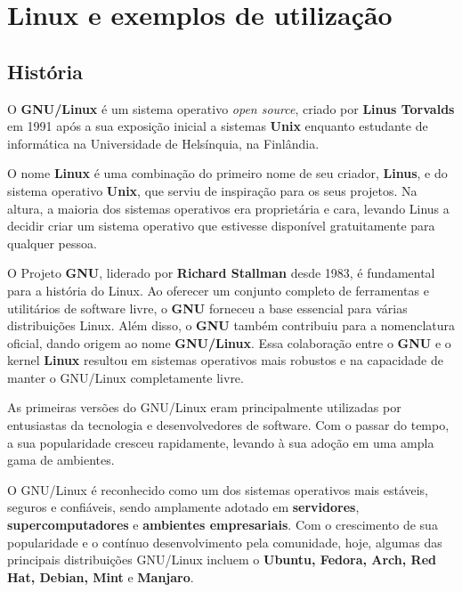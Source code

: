 ﻿\section{Linux e exemplos de utilização} \label{section: linux e exemplos}

\subsection{História}
O \textbf{GNU/Linux} é um sistema operativo \textit{open source}, criado por \textbf{Linus Torvalds} em 1991 após a sua exposição inicial a sistemas \textbf{Unix} enquanto estudante de informática na Universidade de Helsínquia, na Finlândia.
\par \vspace{6pt}
O nome \textbf{Linux} é uma combinação do primeiro nome de seu criador, \textbf{Linus}, e do sistema operativo \textbf{Unix}, que serviu de inspiração para os seus projetos. Na altura, a maioria dos sistemas operativos era proprietária e cara, levando Linus a decidir criar um sistema operativo que estivesse disponível gratuitamente para qualquer pessoa. \cite{linuxHistory}
\par \vspace{6pt}
O Projeto \textbf{GNU}, liderado por \textbf{Richard Stallman} desde 1983, é fundamental para a história do Linux. Ao oferecer um conjunto completo de ferramentas e utilitários de software livre, o \textbf{GNU} forneceu a base essencial para várias distribuições Linux. Além disso, o \textbf{GNU} também contribuiu para a nomenclatura oficial, dando origem ao nome \textbf{GNU/Linux}. Essa colaboração entre o \textbf{GNU} e o kernel \textbf{Linux} resultou em sistemas operativos mais robustos e na capacidade de manter o GNU/Linux completamente livre. \cite{gnuHistory}
\par \vspace{6pt}
As primeiras versões do GNU/Linux eram principalmente utilizadas por entusiastas da tecnologia e desenvolvedores de software. Com o passar do tempo, a sua popularidade cresceu rapidamente, levando à sua adoção em uma ampla gama de ambientes.
\par \vspace{6pt}
O GNU/Linux é reconhecido como um dos sistemas operativos mais estáveis, seguros e confiáveis, sendo amplamente adotado em \textbf{servidores}, \textbf{supercomputadores} e \textbf{ambientes empresariais}. Com o crescimento de sua popularidade e o contínuo desenvolvimento pela comunidade, hoje, algumas das principais distribuições GNU/Linux incluem o \textbf{Ubuntu, Fedora, Arch, Red Hat, Debian, Mint} e \textbf{Manjaro}.

